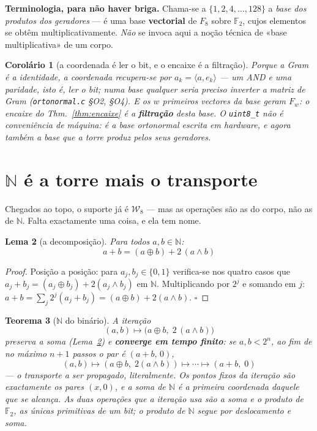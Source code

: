 \documentclass[11pt,a4paper]{article}
\newtheorem{teorema}{Teorema}
\newtheorem{corolario}[teorema]{Corolário}
\newtheorem{lema}[teorema]{Lema}
\newcommand{\code}[1]{\texttt{\small #1}}
\newcommand{\Word}{\mathcal{W}}
\newcommand{\FF}{\mathbb{F}}
\begin{document}
\noindent\textbf{Terminologia, para não haver briga.} Chama-se a
$\{1,2,4,\ldots,128\}$ a \emph{base dos produtos dos geradores} --- é uma base
\textbf{vectorial} de $F_8$ sobre $\FF_2$, cujos elementos se obtêm
multiplicativamente. \emph{Não} se invoca aqui a noção técnica de «base
multiplicativa» de um corpo.

\begin{corolario}[a coordenada é ler o bit, e o encaixe é a filtração]
Porque a Gram é a identidade, a coordenada recupera-se por
$a_k=\langle a,e_k\rangle$ --- um AND e uma paridade, isto é, \emph{ler o bit};
numa base qualquer seria preciso inverter a matriz de Gram
(\code{ortonormal.c} §O2, §O4). E os $w$ primeiros vectores da base geram
$F_w$: o encaixe do Thm.~\ref{thm:encaixe} é a \textbf{filtração} desta
base. \emph{O \code{uint8\_t} não é conveniência de máquina: é a base
ortonormal escrita em hardware}, e agora também a base que a torre produz
pelos seus geradores.
\end{corolario}

\section{$\mathbb{N}$ é a torre mais o transporte}\label{sec:transporte}

\noindent Chegados ao topo, o suporte já é $\Word_8$ --- mas as operações são
as do corpo, não as de $\mathbb{N}$. Falta exactamente uma coisa, e ela tem nome.

\begin{lema}[a decomposição]\label{lem:carry}
Para todos $a,b\in\mathbb{N}$:
\[
\boxed{\;a+b=(a\oplus b)+2\,(a\wedge b)\;}
\]
\end{lema}

\begin{proof}
Posição a posição: para $a_j,b_j\in\{0,1\}$ verifica-se nos quatro casos que
$a_j+b_j=(a_j\oplus b_j)+2(a_j\wedge b_j)$ em $\mathbb{N}$. Multiplicando por
$2^{j}$ e somando em $j$:
$a+b=\sum_j 2^{j}(a_j+b_j)=(a\oplus b)+2(a\wedge b)$. $\square$
\end{proof}

\begin{teorema}[$\mathbb{N}$ do binário]\label{thm:transporte}
A iteração
\[
(a,b)\longmapsto\bigl(a\oplus b,\;2\,(a\wedge b)\bigr)
\]
preserva a soma (Lema~\ref{lem:carry}) e \textbf{converge em tempo finito}: se
$a,b<2^{n}$, ao fim de no máximo $n+1$ passos o par é $(a+b,\,0)$,
\[
\boxed{\;(a,b)\longmapsto(a\oplus b,\;2(a\wedge b))\longmapsto\cdots
\longmapsto(a+b,\;0)\;}
\]
--- o transporte a ser propagado, literalmente. Os pontos fixos da iteração são
exactamente os pares $(x,0)$, e a soma de $\mathbb{N}$ é a primeira coordenada
daquele que se alcança. As duas operações que a iteração usa são a soma e o
produto de $\FF_2$, as únicas primitivas de um bit; o produto de $\mathbb{N}$
segue por deslocamento e soma.
\end{teorema}
\end{document}
